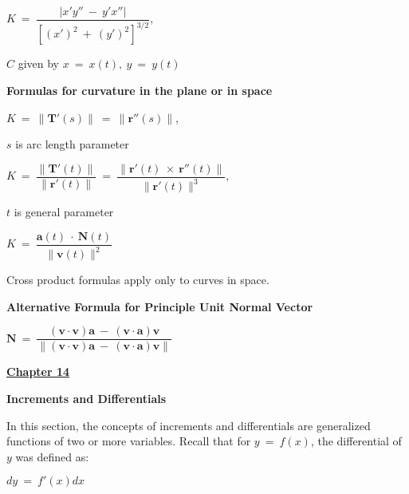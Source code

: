 \documentclass{article}
\begin{document}
\begin{large}
\hspace{0.5in} $K\ =\ \dfrac{|x'y''\ -\ y'x''|}{[(x')^{2}\ +\ (y')^{2}]^{3/2}}$, \begin{Large} $C$ given by $x\ =\ x(t),\ y\ =\ y(t)$ \end{Large}

\hspace{0.1in} \textbf{Formulas for curvature in the plane or in space}

\hspace{0.5in} $K\ =\ \|\textbf{T}'(s)\|\ =\ \|\textbf{r}''(s)\|$, \begin{Large} $s$ is arc length parameter \end{Large}

\hspace{0.5in} $K\ =\ \dfrac{\|\textbf{T}'(t)\|}{\|\textbf{r}'(t)\|}\ =\ \dfrac{\|\textbf{r}'(t)\ \times\ \textbf{r}''(t)\|}{\|\textbf{r}'(t)\|^{3}}$, \begin{Large} $t$ is general parameter \end{Large}

\hspace{0.5in} $K\ =\ \dfrac{\textbf{a}(t)\ \cdot\ \textbf{N}(t)}{\|\textbf{v}(t)\|^{2}}$

\hspace{0.1in} Cross product formulas apply only to curves in space.

\vspace{1.0in}
\textbf{Alternative Formula for Principle Unit Normal Vector}

\hspace{1.0in} $\textbf{N}\ =\ \dfrac{(\textbf{v}\cdot\textbf{v})\textbf{a}\ -\ (\textbf{v}\cdot\textbf{a})\textbf{v}}{\|(\textbf{v}\cdot\textbf{v})\textbf{a}\ -\ (\textbf{v}\cdot\textbf{a})\textbf{v}\|}$

\vspace{0.25in}

\underline{\textbf{\huge Chapter 14 \phantom{ } \phantom{ } \phantom{ } \phantom{ }}}

\textbf{Increments and Differentials}

\hspace{0.1in} In this section, the concepts of increments and differentials are generalized functions of two or more variables.  Recall that for $y\ =\ f(x)$, the differential of $y$ was defined as:

\vspace{-0.2in}
\hspace{2.5in} $dy\ =\ f'(x)dx$


\end{large}
\end{document}
